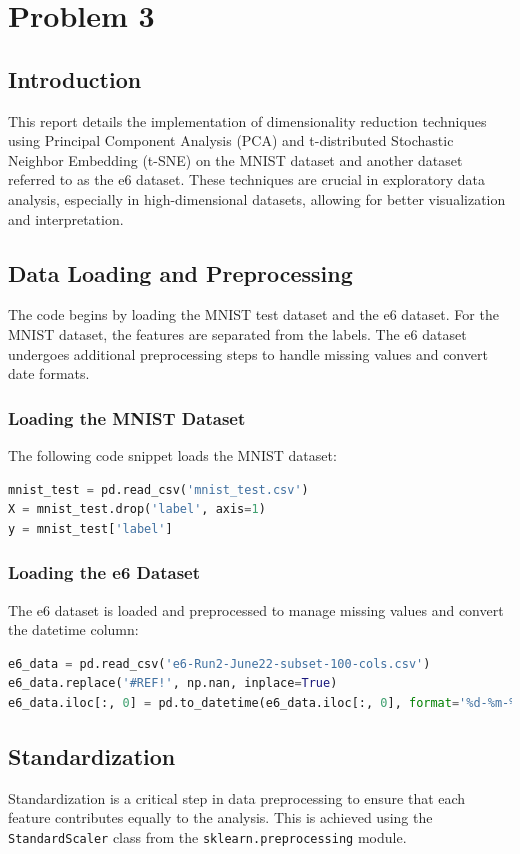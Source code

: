 \section{Problem 3}

\subsection{Introduction}
This report details the implementation of dimensionality reduction techniques using Principal Component Analysis (PCA) and t-distributed Stochastic Neighbor Embedding (t-SNE) on the MNIST dataset and another dataset referred to as the e6 dataset. These techniques are crucial in exploratory data analysis, especially in high-dimensional datasets, allowing for better visualization and interpretation.

\subsection{Data Loading and Preprocessing}
The code begins by loading the MNIST test dataset and the e6 dataset. For the MNIST dataset, the features are separated from the labels. The e6 dataset undergoes additional preprocessing steps to handle missing values and convert date formats.

\subsubsection{Loading the MNIST Dataset}
The following code snippet loads the MNIST dataset:
\begin{lstlisting}[language=Python]
mnist_test = pd.read_csv('mnist_test.csv')
X = mnist_test.drop('label', axis=1)
y = mnist_test['label']
\end{lstlisting}

\subsubsection{Loading the e6 Dataset}
The e6 dataset is loaded and preprocessed to manage missing values and convert the datetime column:
\begin{lstlisting}[language=Python]
e6_data = pd.read_csv('e6-Run2-June22-subset-100-cols.csv')
e6_data.replace('#REF!', np.nan, inplace=True)
e6_data.iloc[:, 0] = pd.to_datetime(e6_data.iloc[:, 0], format='%d-%m-%Y')
\end{lstlisting}

\subsection{Standardization}
Standardization is a critical step in data preprocessing to ensure that each feature contributes equally to the analysis. This is achieved using the \texttt{StandardScaler} class from the \texttt{sklearn.preprocessing} module.

